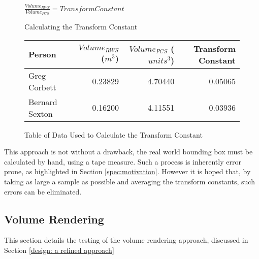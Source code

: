\begin{figure}[h]
\begin{center}
$\frac{Volume_{RWS}}{Volume_{PCS}} = Transform Constant$
\end{center}
\caption{Calculating the Transform Constant}
\label{testing: calculating the transform constant}
\end{figure}
\begin{figure}[h]
\begin{center}
  \begin{tabular}{| l | r | r | r |}
    \hline
    Person & $Volume_{RWS}$ ($m^3$) & $Volume_{PCS}$ ($units^3$) & Transform Constant \\ \hline
    Greg Corbett 	& 0.23829 & 4.70440 & 0.05065\\ \hline
    Bernard Sexton 	& 0.16200 & 4.11551 & 0.03936\\ \hline
  \end{tabular}
\end{center}
\caption{Table of Data Used to Calculate the Transform Constant}
\label{testing: table of data used to calculate the transform constant}
\end{figure}

This approach is not without a drawback, the real world bounding box must be calculated by hand, using a tape measure. Such a process is inherently error prone, as highlighted in Section \ref{spec:motivation}. However it is hoped that, by taking as large a sample as possible and averaging the transform constants, such errors can be eliminated.\\

\subsection{Volume Rendering}
\label{testing: volume rendering}
This section details the testing of the volume rendering approach, discussed in Section \ref{design: a refined approach}